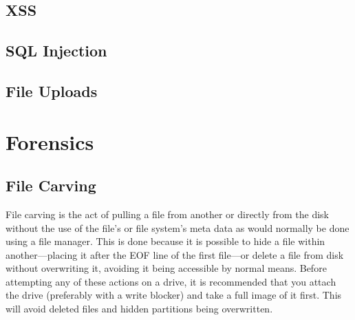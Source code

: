 \documentclass[a4paper,11pt]{report}
\begin{document}
	\section{XSS}
	\section{SQL Injection}
	\section{File Uploads}
\chapter{Forensics}
	\label{ch:Forensics}
	\section{File Carving}
		File carving is the act of pulling a file from another or directly from the disk without the use of the file's or file system's meta data as would normally be done using a file manager. 
		This is done because it is possible to hide a file within another---placing it after the EOF line of the first file---or delete a file from disk without overwriting it, avoiding it being accessible by normal means. 
		Before attempting any of these actions on a drive, it is recommended that you attach the drive (preferably with a write blocker) and take a full image of it first. 
		This will avoid deleted files and hidden partitions being overwritten. 
\end{document}
